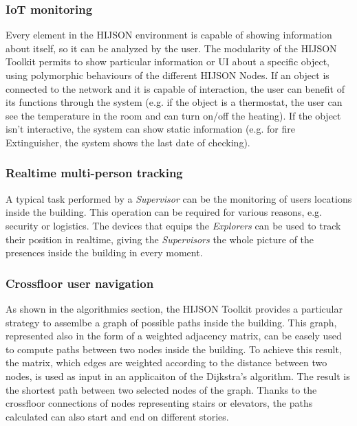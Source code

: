 \subsubsection{IoT monitoring}\label{iot-monitoring}

Every element in the HIJSON environment is capable of showing information
about itself, so it can be analyzed by the user. The modularity of the HIJSON
Toolkit permits to show particular information or UI about a specific object,
using polymorphic behaviours of the different HIJSON Nodes. If an object is
connected to the network and it is capable of interaction, the user can
benefit of its functions through the system (e.g. if the object is a
thermostat, the user can see the temperature in the room and can turn on/off
the heating). If the object isn't interactive, the system can show static
information (e.g. for fire Extinguisher, the system shows the last date of
checking).

\subsubsection{Realtime multi-person tracking}\label{realtime-multi-person-tracking}

A typical task performed by a \emph{Supervisor} can be the monitoring of users
locations inside the building. This operation can be required for various
reasons, e.g. security or logistics. The devices that equips the
\emph{Explorers} can be used to track their position in realtime, giving the
\emph{Supervisors} the whole picture of the presences inside the building in
every moment.

\subsubsection{Crossfloor user navigation}\label{crossfloor-user-navigation}

As shown in the algorithmics section, the HIJSON Toolkit provides a particular
strategy to assemlbe a graph of possible paths inside the building. This
graph, represented also in the form of a weighted adjacency matrix, can be
easely used to compute paths between two nodes inside the building. To
achieve this result, the matrix, which edges are weighted according to the
distance between two nodes, is used as input in an applicaiton of the
Dijkstra's algorithm. The result is the shortest path between two selected
nodes of the graph. Thanks to the crossfloor connections of nodes
representing stairs or elevators, the paths calculated can also start and end
on different stories.



